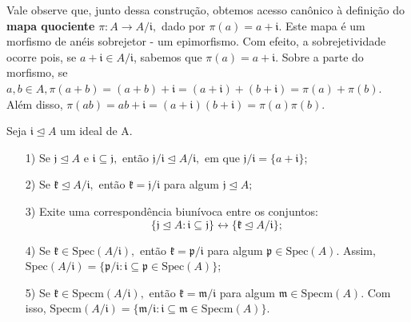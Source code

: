 \documentclass[algebraII_notes.tex]{subfiles}
\begin{document}
Vale observe que, junto dessa construção, obtemos acesso canônico à definição do \textbf{mapa quociente} \(\pi :A\rightarrow A/\mathfrak{i},\)
dado por \(\pi(a) = a + \mathfrak{i}.\) Este mapa é um morfismo de anéis sobrejetor - um epimorfismo.
Com efeito, a sobrejetividade ocorre pois, se \(a+\mathfrak{i}\in A/\mathfrak{i}\), sabemos que \(\pi(a)= a + \mathfrak{i}.\)
Sobre a parte do morfismo, se \(a, b\in A, \pi (a+b) = (a+b)+\mathfrak{i} = (a+\mathfrak{i})+(b+\mathfrak{i}) = \pi(a) + \pi(b)\).
Além disso, \(\pi (ab) = ab + \mathfrak{i} = (a+\mathfrak{i})(b+\mathfrak{i}) = \pi (a)\pi (b).\)
\begin{prop*}
	Seja \(\mathfrak{i}\trianglelefteq{A}\) um ideal de A.
	\begin{itemize}
		\item[1)] Se \(\mathfrak{j}\trianglelefteq{A}\) e \(\mathfrak{i}\subseteq{\mathfrak{j}}, \) então \(\mathfrak{j}/\mathfrak{i}\trianglelefteq{A/\mathfrak{i}},\) em que
		      \(\mathfrak{j}/\mathfrak{i}=\{a+\mathfrak{i}\}\);
		\item[2)] Se \(\mathfrak{k}\trianglelefteq{A/\mathfrak{i}},\) então \(\mathfrak{k}=\mathfrak{j}/\mathfrak{i}\) para algum \(\mathfrak{j}\trianglelefteq{A};\)
		\item[3)] Exite uma correspondência biunívoca entre os conjuntos:
		      \[
			      \biggl\{\mathfrak{j}\trianglelefteq{A}: \mathfrak{i}\subseteq{\mathfrak{j}}\biggr\}\longleftrightarrow \biggl\{\mathfrak{k}\trianglelefteq{A/\mathfrak{i}}\biggr\};
		      \]
		\item[4)] Se \(\mathfrak{k}\in \mathrm{Spec}(A/\mathfrak{i}),\) então \(\mathfrak{k} = \mathfrak{p}/\mathfrak{i}\) para algum \(\mathfrak{p}\in \mathrm{Spec}(A).\)
		      Assim, \(\mathrm{Spec}(A/\mathfrak{i}) = \{\mathfrak{p}/\mathfrak{i}:\mathfrak{i}\subseteq{\mathfrak{p}}\in \mathrm{Spec}(A)\}\);
		\item[5)] Se \(\mathfrak{k}\in \mathrm{Specm}(A/\mathfrak{i}),\) então \(\mathfrak{k} = \mathfrak{m}/\mathfrak{i}\) para algum \(\mathfrak{m}\in \mathrm{Specm}(A).\)
		      Com isso, \(\mathrm{Specm}(A/\mathfrak{i}) = \{\mathfrak{m}/\mathfrak{i}: \mathfrak{i}\subseteq{\mathfrak{m}}\in \mathrm{Specm}(A)\}.\)
	\end{itemize}
\end{prop*}
\end{document}
